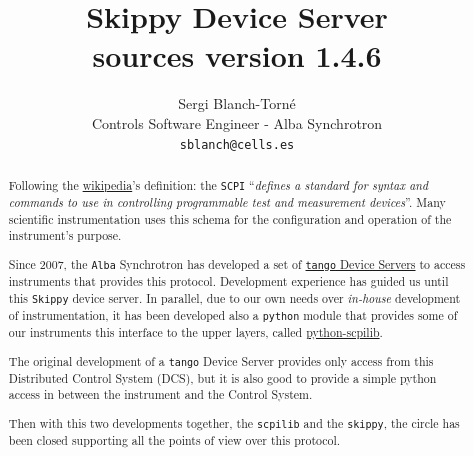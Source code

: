 \documentclass[a4paper,10pt]{article}
\title{Skippy Device Server \\
\large sources version 1.4.6}
\author{Sergi Blanch-Torn\'e\\\small{Controls Software Engineer - Alba Synchrotron}\\{\tt \small{sblanch@cells.es}}}
\begin{document}
\maketitle

\begin{abstract}
Following the \href{https://en.wikipedia.org/wiki/Standard_Commands_for_Programmable_Instruments}{wikipedia}'s definition:  the \texttt{SCPI} ``\emph{defines a standard for syntax and commands to use in controlling programmable test and measurement devices}''. Many scientific instrumentation uses this schema for the configuration and operation of the instrument's purpose.

Since 2007, the \texttt{Alba} Synchrotron has developed a set of \href{http://tango.controls.org}{\texttt{tango} Device Servers} to access instruments that provides this protocol. Development experience has guided us until this \texttt{Skippy} device server. In parallel, due to our own needs over \emph{in-house} development of instrumentation, it has been developed also a \texttt{python} module that provides some of our instruments this interface to the upper layers, called \href{https://github.com/srgblnch/python-scpilib}{python-scpilib}.

The original development of a \texttt{tango} Device Server provides only access from this Distributed Control System (DCS), but it is also good to provide a simple python access in between the instrument and the Control System.

Then with this two developments together, the \texttt{scpilib} and the \texttt{skippy}, the circle has been closed supporting all the points of view over this protocol.


\end{abstract}
\end{document}
